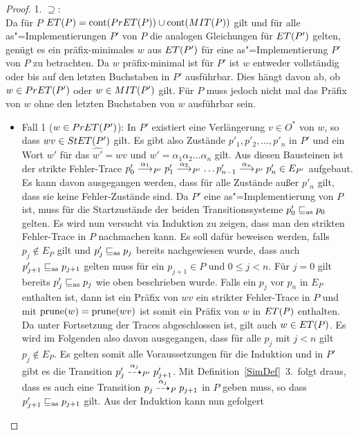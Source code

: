 \begin{proof}
  1. \glqq$\supseteq$\grqq{}:\\
  Da für $P$ $ET (P) = \mathrm{cont} (PrET (P)) \cup \mathrm{cont} (MIT (P))$ gilt und für
  alle as"=Implementierungen $P'$ von $P$ die analogen Gleichungen für $ET
  (P')$ gelten, genügt es ein präfix-minimales $w$ aus $ET (P')$ für eine
  as"=Implementierung $P'$ von $P$ zu betrachten. Da $w$ präfix-minimal ist für
  $P'$ ist $w$ entweder vollständig oder bis auf den letzten Buchstaben in $P'$
  ausführbar. Dies hängt davon ab, ob $w\in PrET (P')$ oder $w\in MIT (P')$
  gilt. Für $P$ muss jedoch nicht mal das Präfix von $w$ ohne den letzten
  Buchstaben von $w$ ausführbar sein.
  \begin{itemize}
    \item Fall 1 ($w\in PrET (P')$): In $P'$ existiert eine Verlängerung $v\in
      O^*$ von $w$, so dass $wv\in StET (P')$ gilt. Es gibt also Zustände
      $p'_1, p'_2,\dots ,p'_n$ in $P'$ und ein Wort $w'$ für das $\hat{w'}=wv$
      und $w'=\alpha _1\alpha _2\dots \alpha _n$ gilt. Aus diesen Bausteinen
      ist der strikte Fehler-Trace $p'_0 \must[\alpha _1]_{P'} p'_1
      \must[\alpha _2]_{P'} \dots p'_{n-1} \must[\alpha _n]_{P'} p'_n \in
      E_{P'}$ aufgebaut. Es kann \oBdA{} davon ausgegangen werden, dass für
      alle Zustände außer $p'_n$ gilt, dass sie keine Fehler-Zustände sind. Da
      $P'$ eine as"=Implementierung von $P$ ist, muss für die Startzustände der
      beiden Transitionssysteme $p'_0\sqsubseteq _{\mathrm{as}} p_0$ gelten. Es wird nun versucht
      via Induktion zu zeigen, dass man den strikten Fehler-Trace in $P$
      nachmachen kann. Es soll dafür beweisen werden, falls $p_j\notin E_P$
      gilt und $p'_j\sqsubseteq _{\mathrm{as}} p_j$ bereits nachgewiesen wurde, dass auch
      $p'_{j+1}\sqsubseteq _{\mathrm{as}} p_{j+1}$ gelten muss für ein $p_{j+1}\in P$ und $0\leq j
      < n$. Für $j=0$ gilt bereits $p'_j\sqsubseteq _{\mathrm{as}} p_j$ wie oben beschrieben wurde.
      Falls ein $p_j$ vor $p_n$ in $E_P$ enthalten ist, dann ist ein Präfix von
      $wv$ ein strikter Fehler-Trace in $P$ und mit $\mathrm{prune}(w)=\mathrm{prune}(wv)$ ist
      somit ein Präfix von $w$ in $ET (P)$ enthalten. Da \ET{} unter
      Fortsetzung der Traces abgeschlossen ist, gilt auch $w\in ET (P)$. Es
      wird im Folgenden also davon ausgegangen, dass für alle $p_j$ mit $j < n$
      gilt $p_j\notin E_P$. Es gelten somit alle Voraussetzungen für die
      Induktion und in $P'$ gibt es die Transition $p'_j \may[\alpha _{j}]_{P'}
      p'_{j+1}$. Mit Definition~\ref{SimDef}~3.\ folgt draus, dass es auch eine
      Transition $p_j \may[\alpha _{j}]_P p_{j+1}$ in $P$ geben muss, so dass
      $p'_{j+1}\sqsubseteq _{\mathrm{as}} p_{j+1}$ gilt. Aus der Induktion kann nun gefolgert

\end{itemize}
\end{proof}
